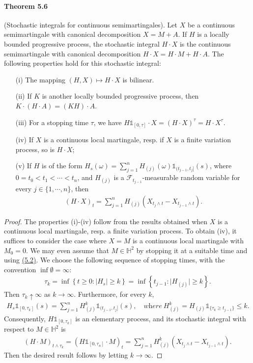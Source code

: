 \documentclass{article}
\numberwithin{equation}{section}
\theoremstyle{plain}
\theoremstyle{definition}
\begin{document}
\paragraph{Theorem 5.6\label{thm:5.6}} (Stochastic integrals for continuous semimartingales). Let $X$ be a continuous semimartingale with canonical decomposition $X=M+A$. If $H$ is a locally bounded progressive process, the stochastic integral $H\cdot X$ is the continuous semimartingale with canonical decomposition $H\cdot X=H\cdot M + H\cdot A$. The following properties hold for this stochastic integral:
\begin{itemize}
	\item[(i)] The mapping $(H,X)\mapsto H\cdot X$ is bilinear.
	\item[(ii)] If $K$ is another locally bounded progressive process, then $K\cdot (H\cdot A)=(KH)\cdot A$.
	\item[(iii)] For a stopping time $\tau$, we have $H\mathds{1}_{[0,\tau]}\cdot X = (H\cdot X)^\tau = H\cdot X^\tau$.
	\item[(iv)] If $X$ is a continuous local martingale, resp. if $X$ is a finite variation process, so is $H\cdot X$;
	\item[(v)] If $H$ is of the form $H_s(\omega)=\sum_{j=1}^nH_{(j)}(\omega)\mathds{1}_{(t_{j-1},t_j]}(s)$, where $0=t_0<t_1<\cdots<t_n$, and $H_{(j)}$ is a $\mathscr{F}_{t_{j-1}}$-measurable random variable for every $j\in\{1,\cdots,n\}$, then
	\begin{align*}
		(H\cdot X)_t = \sum_{j=1}^n H_{(j)}\left(X_{t_j\wedge t}-X_{t_{j-1}\wedge t}\right).
	\end{align*}
\end{itemize}
\begin{proof}
The properties (i)-(iv) follow from the results obtained when $X$ is a continuous local martingale, resp. a finite variation process. To obtain (iv), it suffices to consider the case where $X=M$ is a continuous local martingale with $M_0=0$. We may even assume that $M\in\mathbb{H}^2$ by stopping it at a suitable time and using \hyperref[eq:5.2]{(5.2)}. We choose the following sequence of stopping times, with the convention $\inf\emptyset=\infty$:
\begin{align*}
	\tau_k=\inf\left\{t\geq 0:\vert H_s\vert\geq k\right\} = \inf\left\{t_{j-1}:\vert H_{(j)}\vert\geq k\right\}.
\end{align*}
Then $\tau_k\uparrow\infty$ as $k\to\infty$. Furthermore, for every $k$,
\begin{align*}
	H_s\mathds{1}_{[0,\tau_k]}(s) = \sum_{j=1}^nH_{(j)}^k \mathds{1}_{(t_{j-1},t_j]}(s),\quad \textit{where}\ H_{(j)}^k = H_{(j)}\mathds{1}_{\{\tau_k\geq t_{j-1}\}}\leq k.
\end{align*}
Consequently, $H\mathds{1}_{[0,\tau_k]}$ is an elementary process, and its stochastic integral with respect to $M\in\mathbb{H}^2$ is
\begin{align*}
	(H\cdot M)_{t\wedge\tau_k}=(H\mathds{1}_{[0,\tau_n]}\cdot M)_t = \sum_{j=1}^n H_{(j)}^k\left(X_{t_j\wedge t}-X_{t_{j-1}\wedge t}\right).
\end{align*}
Then the desired result follows by letting $k\to\infty$.
\end{proof}
\end{document}
